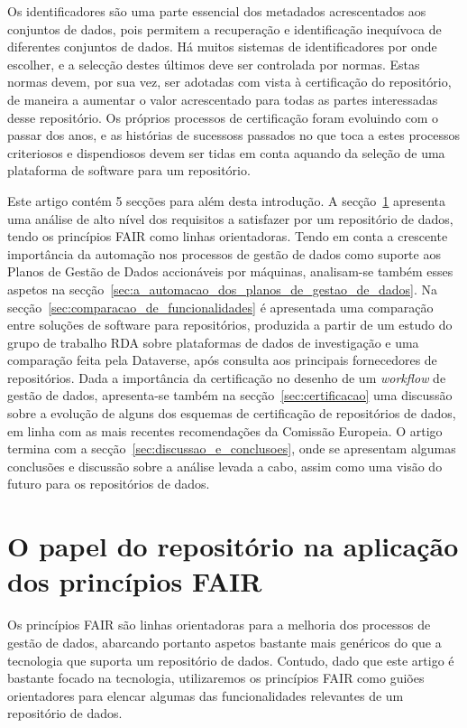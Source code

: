 \documentclass[sigconf,nonacm]{acmart}
\begin{document}
Os identificadores são uma parte essencial dos metadados acrescentados aos conjuntos de dados, pois permitem a recuperação e identificação inequívoca de diferentes conjuntos de dados. Há muitos sistemas de identificadores por onde escolher, e a selecção destes últimos deve ser controlada por normas. Estas normas devem, por sua vez, ser adotadas com vista à certificação do repositório, de maneira a aumentar o valor acrescentado para todas as partes interessadas desse repositório. Os próprios processos de certificação foram evoluindo com o passar dos anos, e as histórias de sucessoss passados no que toca a estes processos criteriosos e dispendiosos devem ser tidas em conta aquando da seleção de uma plataforma de software para um repositório.

Este artigo contém 5 secções para além desta introdução. A secção~\ref{sec:o_papel_do_repositorio_na_aplicacao_dos_principios_fair} apresenta uma análise de alto nível dos requisitos a satisfazer por um repositório de dados, tendo os princípios FAIR como linhas orientadoras. 
%
Tendo em conta a crescente importância da automação nos processos de gestão de dados como suporte aos Planos de Gestão de Dados accionáveis por máquinas, analisam-se também esses aspetos na secção~\ref{sec:a_automacao_dos_planos_de_gestao_de_dados}.
%
Na secção~\ref{sec:comparacao_de_funcionalidades} é apresentada uma comparação entre soluções de software para repositórios, produzida a partir de um estudo do grupo de trabalho RDA sobre plataformas de dados de investigação e uma comparação feita pela Dataverse, após consulta aos principais fornecedores de repositórios.
%
Dada a importância da certificação no desenho de um \emph{workflow} de gestão de dados, apresenta-se também na secção~\ref{sec:certificacao} uma discussão sobre a evolução de alguns dos esquemas de certificação de repositórios de dados, em linha com as mais recentes recomendações da Comissão Europeia. 
%
O artigo termina com a secção~\ref{sec:discussao_e_conclusoes}, onde se apresentam algumas conclusões e discussão sobre a análise levada a cabo, assim como uma visão do futuro para os repositórios de dados. 

\section{O papel do repositório na aplicação dos princípios FAIR} %
\label{sec:o_papel_do_repositorio_na_aplicacao_dos_principios_fair}

Os princípios FAIR são linhas orientadoras para a melhoria dos processos de gestão de dados, abarcando portanto aspetos bastante mais genéricos do que a tecnologia que suporta um repositório de dados. Contudo, dado que este artigo é bastante focado na tecnologia, utilizaremos os princípios FAIR como guiões orientadores para elencar algumas das funcionalidades relevantes de um repositório de dados. 
\end{document}
